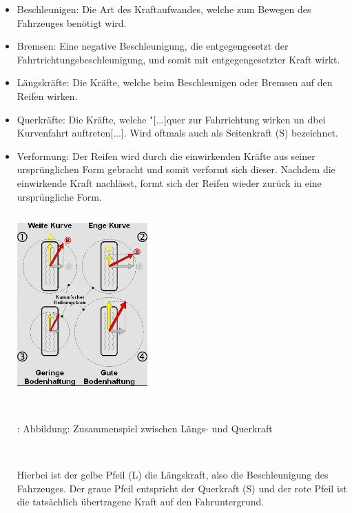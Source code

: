 \documentclass{article}
\begin{document}
				\begin{itemize}
					\item Beschleunigen: Die Art des Kraftaufwandes, welche zum Bewegen des Fahrzeuges benötigt wird.
					\item Bremsen: Eine negative Beschleunigung, die entgegengesetzt der Fahrtrichtungsbeschleunigung, und somit mit entgegengesetzter Kraft wirkt.
					\item Längskräfte: Die Kräfte, welche beim Beschleunigen oder Bremsen auf den Reifen wirken.
					\item Querkräfte: Die Kräfte, welche "[...]quer zur Fahrrichtung wirken un dbei Kurvenfahrt auftreten[...].\cite{TS18} Wird oftmals auch als Seitenkraft (S) bezeichnet.
					\item Verformung: Der Reifen wird durch die einwirkenden Kräfte aus seiner ursprünglichen Form gebracht und somit verformt sich dieser. Nachdem die einwirkende Kraft nachlässt, formt sich der Reifen wieder zurück in eine ursprüngliche Form.
					
					\begin{center}
						\includegraphics[width=5cm, height=7cm] {Images/Kapitel5/l_qkraft.png}
						\caption {\\\cite{TS19}: Abbildung: Zusammenspiel zwischen Längs- und Querkraft}
					\end{center}\\
					
					\begin{flushleft}
						Hierbei ist der gelbe Pfeil (L) die Längskraft, also die Beschleunigung des Fahrzeuges.
						Der graue Pfeil entspricht der Querkraft (S) und der rote Pfeil ist die tatsächlich übertragene Kraft auf den Fahruntergrund.\\
					\end{flushleft}
					  
				\end{itemize}
			
\end{document}
